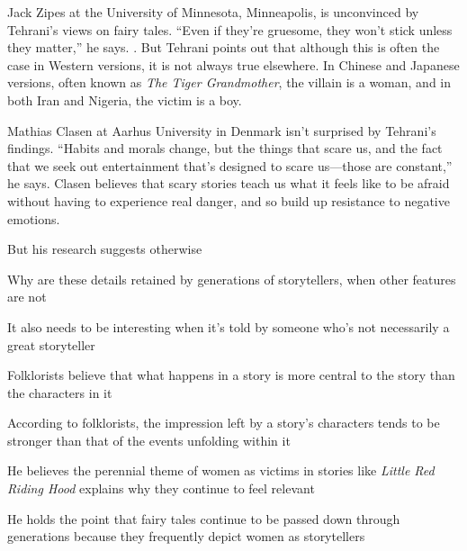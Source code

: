 \documentclass{exam-zh}
\begin{document}
Jack Zipes at the University of Minnesota, Minneapolis, is unconvinced by Tehrani's views on fairy tales. ``Even if they're gruesome, they won't stick unless they matter,'' he says. \fillin[F]. But Tehrani points out that although this is often the case in Western versions, it is not always true elsewhere. In Chinese and Japanese versions, often known as \textit{The Tiger Grandmother}, the villain is a woman, and in both Iran and Nigeria, the victim is a boy.

Mathias Clasen at Aarhus University in Denmark isn't surprised by Tehrani's findings. ``Habits and morals change, but the things that scare us, and the fact that we seek out entertainment that's designed to scare us—those are constant,'' he says. Clasen believes that scary stories teach us what it feels like to be afraid without having to experience real danger, and so build up resistance to negative emotions.

\begin{choices}
\item But his research suggests otherwise
\item Why are these details retained by generations of storytellers, when other features are not
\item It also needs to be interesting when it's told by someone who's not necessarily a great storyteller
\item Folklorists believe that what happens in a story is more central to the story than the characters in it
\item According to folklorists, the impression left by a story’s characters tends to be stronger than that of the events unfolding within it
\item He believes the perennial theme of women as victims in stories like \textit{Little Red Riding Hood} explains why they continue to feel relevant
\item He holds the point that fairy tales continue to be passed down through generations because they frequently depict women as storytellers
\end{choices}
\end{document}

